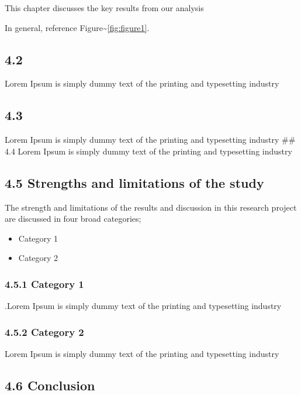 \documentclass[12pt,]{article}
\providecommand{\tightlist}{%
  \setlength{\itemsep}{0pt}\setlength{\parskip}{0pt}}
\begin{document}
This chapter discusses the key results from our analysis

In general, reference Figure\textasciitilde{}\ref{fig:figure1}.

\subsection{4.2}\label{section-9}

Lorem Ipsum is simply dummy text of the printing and typesetting
industry

\subsection{4.3}\label{section-10}

Lorem Ipsum is simply dummy text of the printing and typesetting
industry \#\# 4.4 Lorem Ipsum is simply dummy text of the printing and
typesetting industry

\subsection{4.5 Strengths and limitations of the
study}\label{strengths-and-limitations-of-the-study}

The strength and limitations of the results and discussion in this
research project are discussed in four broad categories;

\begin{itemize}
\tightlist
\item
  Category 1
\item
  Category 2
\end{itemize}

\subsubsection{4.5.1 Category 1}\label{category-1}

.Lorem Ipsum is simply dummy text of the printing and typesetting
industry

\subsubsection{4.5.2 Category 2}\label{category-2}

Lorem Ipsum is simply dummy text of the printing and typesetting
industry

\subsection{4.6 Conclusion}\label{conclusion}
\end{document}
